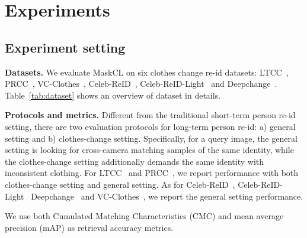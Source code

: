 \documentclass[10pt,twocolumn,letterpaper]{article}
\newcommand{\reid}{re-id}
\newcommand{\myparagraph}[1]{\noindent\textbf{#1.}}
\begin{document}
\section{Experiments}
\label{sec:Experiments}



\subsection{Experiment setting}

\myparagraph{Datasets}
\label{p:dataset-and-preprocessing}
We evaluate MaskCL on six clothes change re-id datasets: 
LTCC~\cite{Change:1}, PRCC~\cite{yang2019person}, VC-Clothes~\cite{vcclothes}, 
Celeb-ReID~\cite{celebreid}, 
Celeb-ReID-Light~\cite{celebreidlight} and Deepchange~\cite{Deepchange}.
Table~\ref{tab:dataset} shows an overview of dataset in details.















\myparagraph{Protocols and metrics}
\label{p:protocols-and-metrics}
Different from the traditional short-term person \reid{} setting, 
there are two evaluation protocols for long-term person \reid{}: a) general setting and b) clothes-change setting. Specifically, for a query image, the general setting is looking for cross-camera matching samples of the same identity, while the clothes-change setting additionally demands the same identity with inconsistent clothing.
For LTCC~\cite{Change:1} and PRCC~\cite{yang2019person}, we report performance with both clothes-change setting  and general setting. As for Celeb-ReID~\cite{celebreid}, Celeb-ReID-Light~\cite{celebreidlight} Deepchange~\cite{Deepchange} and VC-Clothes~\cite{vcclothes}, we report the general setting performance.

We use both Cumulated Matching Characteristics (CMC) and mean average precision (mAP) as retrieval accuracy metrics.
\end{document}

